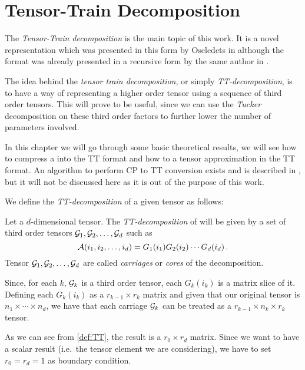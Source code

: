 \chapter{Tensor-Train Decomposition}

The \emph{Tensor-Train decomposition} is the main topic of this work. It is a novel representation which was presented in this form by Oseledets in \cite{oseledets2011tt} although the format was already presented in a recursive form by the same author in \cite{oseledetstyrty2009}.

The idea behind the \emph{tensor train decomposition}, or simply \emph{TT-decomposition}, is to have a way of representing a higher order tensor using a sequence of third order tensors. This will prove to be useful, since we can use the \emph{Tucker} decomposition on these third order factors to further lower the number of parameters involved.

In this chapter we will go through some basic theoretical results, we will see how to compress a  into the TT format and how to  a tensor approximation in the TT format. An algorithm to perform CP to TT conversion exists and is described in \cite{oseledets2011tt}, but it will not be discussed here as it is out of the purpose of this work.

We define the \emph{TT-decomposition} of a given tensor \A as follows:

\begin{Def}
  Let \A a $d$-dimensional tensor. The \emph{TT-decomposition} of \A will be given by a set of third order tensors $\mathcal{G}_1,\mathcal{G}_2,\dots,\mathcal{G}_d$ such as
  \begin{equation} \label{def:TT}
    \mathcal{A}(i_1,i_2,\dots,i_d) = G_1(i_1)G_2(i_2)\cdots G_d(i_d)\, .
  \end{equation}
  Tensor $\mathcal{G}_1,\mathcal{G}_2,\dots,\mathcal{G}_d$ are called \emph{carriages} or \emph{cores} of the decomposition.
\end{Def}

Since, for each $k$, $\mathcal{G}_k$ is a third order tensor, each $G_k(i_k)$ is a matrix slice of it. Defining each $G_k(i_k)$ as a $r_{k-1} \times r_k$ matrix and given that our original tensor \A is $n_1 \times \cdots \times n_d$, we have that each carriage $\mathcal{G}_k$ can be treated as a $r_{k-1} \times n_k \times r_k$ tensor.

As we can see from \eqref{def:TT}, the result is a $r_0 \times r_d$ matrix. Since we want to have a scalar result (i.e.\ the tensor element we are considering), we have to set $r_0 = r_d = 1$ as boundary condition.

